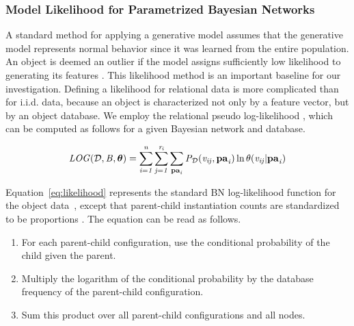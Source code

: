 \documentclass[conference]{IEEEtran}
\begin{document}
\subsubsection{Model Likelihood for Parametrized Bayesian Networks}

A standard method for applying a generative model assumes that the generative model represents normal behavior since it was learned from the entire population. An object is deemed an outlier if the model assigns sufficiently low likelihood to generating its features \cite{Cansado2008}. This likelihood method is an important baseline for our investigation.
Defining a likelihood for relational data is more complicated than for i.i.d. data, because an object is characterized not only by a feature vector, but by an object  database.
We employ the relational pseudo log-likelihood \cite{Schulte2011}, which can be computed as follows for a given Bayesian network  and database.


\begin{equation} \label{eq:likelihood}
\loglikelihood(\D,\model,\parameters) =   \sum_{i=1}^{n}\sum_{j=1}^{\states_{i}} \sum_{\parents_{i}}\P_{\D}(\nodevalue_{ij},\parents_{i})\ln \parameter(\nodevalue_{ij}|\parents_{i})  
\end{equation}


Equation~\eqref{eq:likelihood} represents the standard BN log-likelihood function for the object  data~\cite{Campos2006}, except that parent-child instantiation counts are standardized to be proportions \cite{Schulte2011}. The equation can be read as follows.

\begin{enumerate}
\item For each parent-child configuration, 
use the conditional probability of the child given the parent.
\item Multiply the logarithm of the conditional probability by the database frequency of the parent-child configuration. 
\item Sum this product over all parent-child configurations and all nodes. 
\end{enumerate}
\end{document}
